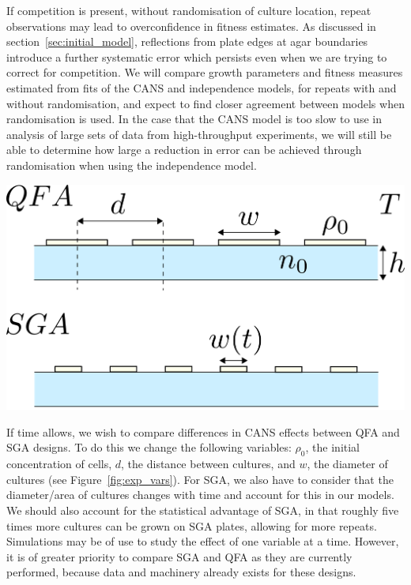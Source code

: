 If competition is present, without randomisation of culture location,
repeat observations may lead to overconfidence in fitness
estimates. As discussed in section~\ref{sec:initial_model},
reflections from plate edges at agar boundaries introduce a further
systematic error which persists even when we are trying to correct
for competition. We will compare growth parameters and fitness
measures estimated from fits of the CANS and independence models, for
repeats with and without randomisation, and expect to find closer
agreement between models when randomisation is used. In the case that
the CANS model is too slow to use in analysis of large sets of
data from high-throughput experiments, we will still be able to
determine how large a reduction in error can be achieved through
randomisation when using the independence model.

\begin{Figure}
  \centering
  \includegraphics[width=\linewidth]{qfa_v_sga_vars}
  \label{fig:exp_vars}
\end{Figure}

If time allows, we wish to compare differences in CANS effects between
QFA and SGA designs. To do this we change the following variables:
\(\rho_{0}\), the initial concentration of cells, \(d\), the distance
between cultures, and \(w\), the diameter of cultures (see
Figure~\ref{fig:exp_vars}). For SGA, we also have to consider that the
diameter/area of cultures changes with time and account for this in
our models. We should also account for the statistical advantage of
SGA, in that roughly five times more cultures can be grown on SGA
plates, allowing for more repeats. Simulations may be of use to study
the effect of one variable at a time. However, it is of greater
priority to compare SGA and QFA as they are currently performed,
because data and machinery already exists for these designs.

